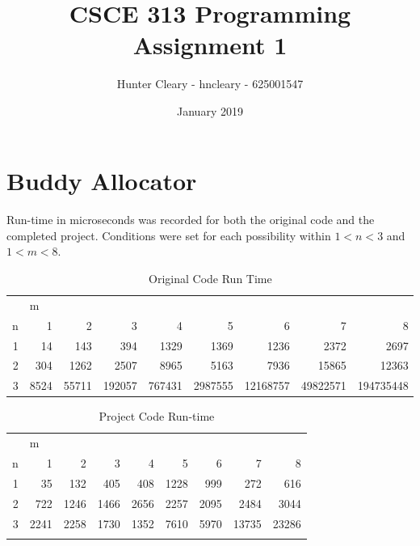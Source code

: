 \documentclass{article}
\title{CSCE  313 Programming Assignment 1}
\author{Hunter Cleary - hncleary - 625001547}
\date{January 2019}
\begin{document}
\maketitle


\section{Buddy Allocator}
\paragraph{} 
\begin{large}
Run-time in microseconds was recorded for both the original code and the completed project. Conditions were set for each possibility within $ 1 < n < 3$ and $ 1 < m < 8 $. 
\end{large}
\begin{table}[htbp]
  \centering
  \caption{Original Code Run Time}
    \begin{tabular}{rrrrrrrrr}
          & \multicolumn{1}{l}{m} &       &       &       &       &       &       &  \\
    \multicolumn{1}{l}{n} & 1     & 2     & 3     & 4     & 5     & 6     & 7     & 8 \\
    1     & 14    & 143   & 394   & 1329  & 1369  & 1236  & 2372  & 2697 \\
    2     & 304   & 1262  & 2507  & 8965  & 5163  & 7936  & 15865 & 12363 \\
    3     & 8524  & 55711 & 192057 & 767431 & 2987555 & 12168757 & 49822571 & 194735448 \\
    \end{tabular}%
  \label{tab:addlabel}%
\end{table}%
\begin{table}[htbp]
  \centering
  \caption{Project Code Run-time}
    \begin{tabular}{rrrrrrrrr}
          & \multicolumn{1}{l}{m} &       &       &       &       &       &       &  \\
    \multicolumn{1}{l}{n} & 1     & 2     & 3     & 4     & 5     & 6     & 7     & 8 \\
    1     & 35    & 132   & 405   & 408   & 1228  & 999   & 272   & 616 \\
    2     & 722   & 1246  & 1466  & 2656  & 2257  & 2095  & 2484  & 3044 \\
    3     & 2241  & 2258  & 1730  & 1352  & 7610  & 5970  & 13735 & 23286 \\
          &       &       &       &       &       &       &       &  \\
    \end{tabular}%
  \label{tab:addlabel}%
\end{table}%
\end{document}
